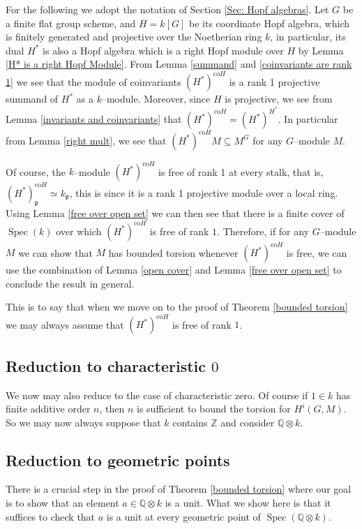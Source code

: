 \documentclass{article}
\theoremstyle{plain}
\theoremstyle{definition}
\DeclareMathOperator{\Spec}{Spec}
\newcommand{\mf}{\mathfrak}
\begin{document}
For the following we adopt the notation of Section \ref{Sec: Hopf algebras}. Let $G$ be a finite flat group scheme, and $H=k[G]$ be its coordinate Hopf algebra, which is finitely generated and projective over the Noetherian ring $k$, in particular, its dual $H^*$ is also a Hopf algebra which is a right Hopf module over $H$ by Lemma \ref{H* is a right Hopf Module}. From Lemma \ref{summand} and \ref{coinvariants are rank 1} we see that the module of coinvariants $(H^*)^{\text{co}H}$ is a rank 1 projective summand of $H^*$ as a $k$--module. Moreover, since $H$ is projective, we see from Lemma \ref{invariants and coinvariants} that  $(H^*)^{\text{co}H}=(H^*)^{H^*}$. In particular from Lemma \ref{right mult}, we see that $(H^*)^{\text{co}H} M\subseteq M^G$ for any $G$--module $M$.

Of course, the $k$--module $(H^*)^{\text{co}H}$ is free of rank 1 at every stalk, that is, $(H^*)^{\text{co}H}_\mf{p} \simeq k_\mf{p}$, this is since it is a rank 1 projective module over a local ring. Using Lemma \ref{free over open set} we can then see that there is a finite cover of $\Spec(k)$ over which $(H^*)^{\text{co}H}$ is free of rank $1$. Therefore, if for any $G$--module $M$ we can show that $M$ has bounded torsion whenever $(H^*)^{\text{co}H}$ is free, we can use the combination of Lemma \ref{open cover} and Lemma \ref{free over open set} to conclude the result in general.

This is to say that when we move on to the proof of Theorem \ref{bounded torsion} we may always assume that $(H^*)^{\text{co}H}$ is free of rank $1$.


\subsection*{Reduction to characteristic $0$}

We now may also reduce to the case of characteristic zero. Of course if $1\in k$ has finite additive order $n$, then $n$ is sufficient to bound the torsion for $H^i(G, M)$. So we may now always suppose that $k$ contains $\mathbb{Z}$ and consider $\mathbb{Q}\otimes k$.


\subsection*{Reduction to geometric points}

There is a crucial step in the proof of Theorem \ref{bounded torsion} where our goal is to show that an element $a\in \mathbb{Q}\otimes k $  is a unit. What we show here is that it suffices to check that $a$ is a unit at every geometric point of $\Spec (\mathbb{Q}\otimes k)$.
\end{document}
